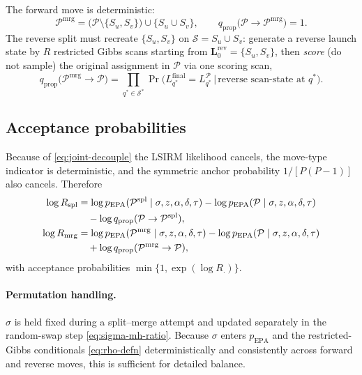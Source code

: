 \documentclass[11pt]{article}
\DeclareMathOperator{\EPA}{EPA}
\begin{document}
The forward move is deterministic:
\begin{equation}
    \mathcal{P}^{\mathrm{mrg}}
    =\bigl(\mathcal{P}\setminus\{S_u,S_v\}\bigr)\cup\{S_u\cup S_v\},
    \qquad q_{\mathrm{prop}}\bigl(\mathcal{P}\to\mathcal{P}^{\mathrm{mrg}}\bigr)=1.
\end{equation}
The reverse split must recreate $\{S_u,S_v\}$ on $\mathcal{S}=S_u\cup S_v$:
generate a reverse launch state by $R$ restricted Gibbs scans starting from
$\mathbf{L}_0^{\mathrm{rev}}=\{S_u,S_v\}$, then \emph{score} (do not sample)
the original assignment in $\mathcal{P}$ via one scoring scan,
\begin{equation}
    q_{\mathrm{prop}}\bigl(\mathcal{P}^{\mathrm{mrg}}\to\mathcal{P}\bigr)
    =\prod_{q^*\in\mathcal{S}^*}
        \Pr\bigl(L_{q^*}^{\mathrm{final}}
                =L_{q^*}^{\mathcal{P}}
                \,\big|\,\text{reverse scan-state at $q^*$}\bigr).
    \label{eq:qrev-merge}
\end{equation}

\subsection{Acceptance probabilities}

Because of \eqref{eq:joint-decouple} the LSIRM likelihood cancels, the
move-type indicator is deterministic, and the symmetric anchor probability
$1/[P(P-1)]$ also cancels.  Therefore
\begin{align}
    \log R_{\mathrm{spl}}
    &=\log p_{\EPA}(\mathcal{P}^{\mathrm{spl}}\mid\sigma,z,\alpha,\delta,\tau)
    -\log p_{\EPA}(\mathcal{P}\mid\sigma,z,\alpha,\delta,\tau)
    \notag\\
    &\quad
    -\log q_{\mathrm{prop}}(\mathcal{P}\to\mathcal{P}^{\mathrm{spl}}),
    \label{eq:logR-split}\\
    \log R_{\mathrm{mrg}}
    &=\log p_{\EPA}(\mathcal{P}^{\mathrm{mrg}}\mid\sigma,z,\alpha,\delta,\tau)
    -\log p_{\EPA}(\mathcal{P}\mid\sigma,z,\alpha,\delta,\tau)
    \notag\\
    &\quad
    +\log q_{\mathrm{prop}}(\mathcal{P}^{\mathrm{mrg}}\to\mathcal{P}),
    \label{eq:logR-merge}
\end{align}
with acceptance probabilities $\min\{1,\exp(\log R_{\cdot})\}$.

\paragraph{Permutation handling.}
$\sigma$ is held fixed during a split--merge attempt and updated separately
in the random-swap step \eqref{eq:sigma-mh-ratio}.  Because $\sigma$ enters
$p_{\EPA}$ and the restricted-Gibbs conditionals \eqref{eq:rho-defn}
deterministically and consistently across forward and reverse moves, this is
sufficient for detailed balance.
\end{document}
